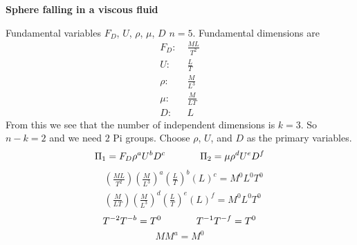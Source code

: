 \clearpage
\begin{example}
  \textbf{Sphere falling in a viscous fluid}
  \begin{center}
  \end{center}
  Fundamental variables $F_{D}$, $U$, $\rho$, $\mu$, $D$
  $n=5$.
  Fundamental dimensions are
  \begin{equation*}
    \begin{split}
      F_{D}:&\;\frac{ML}{T^{2}} \\
      U:&\;\frac{L}{T} \\
      \rho:&\;\frac{M}{L^{3}} \\
      \mu:&\;\frac{M}{LT} \\
      D:&\;L
    \end{split}
  \end{equation*}
  From this we see that the number of independent dimensions is $k=3$.
  So $n-k=2$ and we need $2$ Pi groups.
  Choose $\rho$, $U$, and $D$ as the primary variables.
  \begin{equation*}
    \Pi_{1}=F_{D}\rho^{a}U^{b}D^{c}
    \hspace{0.5in}
    \Pi_{2}=\mu\rho^{d}U^{e}D^{f}
  \end{equation*}
  \begin{equation*}
    \begin{split}
      &\left(\frac{ML}{T^{2}}\right)\left(\frac{M}{L^{3}}\right)^{a}\left(\frac{L}{T}\right)^{b}\left(L\right)^{c}=M^{0}L^{0}T^{0} \\
      &\left(\frac{M}{LT}\right)\left(\frac{M}{L^{3}}\right)^{d}\left(\frac{L}{T}\right)^{e}\left(L\right)^{f}=M^{0}L^{0}T^{0}
    \end{split}
  \end{equation*}
  \begin{equation*}
    T^{-2}T^{-b}=T^{0}
    \hspace{0.5in}
    T^{-1}T^{-f}=T^{0}
  \end{equation*}
  \begin{equation*}
    MM^{a}=M^{0}

\end{equation*}
\end{example}
